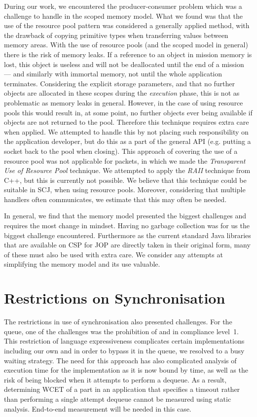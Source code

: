 During our work, we encountered the producer-consumer problem which was a challenge to handle in the scoped memory model. What we found was that the use of the resource pool pattern was considered a generally applied method, with the drawback of copying primitive types when transferring values between memory areas. With the use of resource pools (and the scoped model in general) there is the risk of memory leaks. If a reference to an object in mission memory is lost, this object is useless and will not be deallocated until the end of a mission --- and similarly with immortal memory, not until the whole application terminates. Considering the explicit storage parameters, and that no further objects are allocated in these scopes during the \textit{execution} phase, this is not as problematic as memory leaks in general. However, in the case of using resource pools this would result in, at some point, no further objects ever being available if objects are not returned to the pool. Therefore this technique requires extra care when applied. We attempted to handle this by not placing such responsibility on the application developer, but do this as a part of the general API (e.g. putting a socket back to the pool when closing). This approach of covering the use of a resource pool was not applicable for packets, in which we made the \textit{Transparent Use of Resource Pool} technique. We attempted to apply the \textit{RAII} technique from C++, but this is currently not possible. We believe that this technique could be suitable in SCJ, when using resource pools. Moreover, considering that multiple handlers often communicates, we estimate that this may often be needed.

In general, we find that the memory model presented the biggest challenges and requires the most change in mindset. Having no garbage collection was for us the biggest challenge encountered. Furthermore as the current standard Java libraries that are available on CSP for JOP are directly taken in their original form, many of these must also be used with extra care. We consider any attempts at simplifying the memory model and its use valuable.

 \section{Restrictions on Synchronisation} %
 \label{sec:restrictions_on_synchronisation}
The restrictions in use of synchronisation also presented challenges. For the queue, one of the challenges was the prohibition of \mbox{} and \mbox{} in compliance level~1. This restriction of language expressiveness complicates certain implementations including our own and in order to bypass it in the queue, we resolved to a busy waiting strategy. The need for this approach has also complicated analysis of execution time for the implementation as it is now bound by time, as well as the risk of being blocked when it attempts to perform a dequeue. As a result, determining WCET of a part in an application that specifies a timeout rather than performing a single attempt dequeue cannot be measured using static analysis. End-to-end measurement will be needed in this case.

